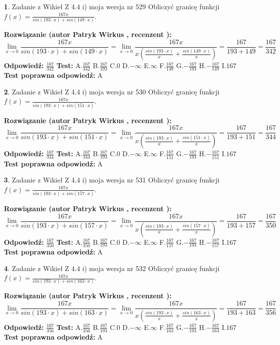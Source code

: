 \documentclass[12pt, a4paper]{article}
\theoremstyle{definition} %
\newtheorem{zad}{}
\newcommand{\zadStart}[1]{\begin{zad}#1\newline}
\newcommand{\zadStop}{\end{zad}}
\newcommand{\rozwStart}[2]{\noindent \textbf{Rozwiązanie (autor #1 , recenzent #2): }\newline}
\newcommand{\rozwStop}{\newline}
\newcommand{\odpStart}{\noindent \textbf{Odpowiedź:}\newline}
\newcommand{\odpStop}{\newline}
\newcommand{\testStart}{\noindent \textbf{Test:}\newline}
\newcommand{\testStop}{\newline}
\newcommand{\kluczStart}{\noindent \textbf{Test poprawna odpowiedź:}\newline}
\newcommand{\kluczStop}{\newline}
\begin{document}
\zadStart{Zadanie z Wikieł Z 4.4 i) moja wersja nr 529}
Obliczyć granicę funkcji $f(x)=\frac{167x}{sin(193\cdot x) +sin(149\cdot x)}$.
\zadStop
\rozwStart{Patryk Wirkus}{}
$$\lim\limits_{x\to 0}\frac{167x}{sin(193\cdot x) +sin(149\cdot x)}=\lim\limits_{x\to 0}\frac{167x}{x(\frac{sin(193\cdot x)}{x}+\frac{sin(149\cdot x)}{x})}=\frac{167}{193+149} = \frac{167}{342}$$
\rozwStop
\odpStart
$\frac{167}{342}$
\odpStop
\testStart
A.$\frac{167}{342}$
B.$\frac{167}{193}$
C.$0$
D.$-\infty$
E.$\infty$
F.$\frac{167}{149}$
G.$-\frac{167}{193}$
H.$-\frac{167}{149}$
I.$167$
\testStop
\kluczStart
A
\kluczStop



\zadStart{Zadanie z Wikieł Z 4.4 i) moja wersja nr 530}
Obliczyć granicę funkcji $f(x)=\frac{167x}{sin(193\cdot x) +sin(151\cdot x)}$.
\zadStop
\rozwStart{Patryk Wirkus}{}
$$\lim\limits_{x\to 0}\frac{167x}{sin(193\cdot x) +sin(151\cdot x)}=\lim\limits_{x\to 0}\frac{167x}{x(\frac{sin(193\cdot x)}{x}+\frac{sin(151\cdot x)}{x})}=\frac{167}{193+151} = \frac{167}{344}$$
\rozwStop
\odpStart
$\frac{167}{344}$
\odpStop
\testStart
A.$\frac{167}{344}$
B.$\frac{167}{193}$
C.$0$
D.$-\infty$
E.$\infty$
F.$\frac{167}{151}$
G.$-\frac{167}{193}$
H.$-\frac{167}{151}$
I.$167$
\testStop
\kluczStart
A
\kluczStop



\zadStart{Zadanie z Wikieł Z 4.4 i) moja wersja nr 531}
Obliczyć granicę funkcji $f(x)=\frac{167x}{sin(193\cdot x) +sin(157\cdot x)}$.
\zadStop
\rozwStart{Patryk Wirkus}{}
$$\lim\limits_{x\to 0}\frac{167x}{sin(193\cdot x) +sin(157\cdot x)}=\lim\limits_{x\to 0}\frac{167x}{x(\frac{sin(193\cdot x)}{x}+\frac{sin(157\cdot x)}{x})}=\frac{167}{193+157} = \frac{167}{350}$$
\rozwStop
\odpStart
$\frac{167}{350}$
\odpStop
\testStart
A.$\frac{167}{350}$
B.$\frac{167}{193}$
C.$0$
D.$-\infty$
E.$\infty$
F.$\frac{167}{157}$
G.$-\frac{167}{193}$
H.$-\frac{167}{157}$
I.$167$
\testStop
\kluczStart
A
\kluczStop



\zadStart{Zadanie z Wikieł Z 4.4 i) moja wersja nr 532}
Obliczyć granicę funkcji $f(x)=\frac{167x}{sin(193\cdot x) +sin(163\cdot x)}$.
\zadStop
\rozwStart{Patryk Wirkus}{}
$$\lim\limits_{x\to 0}\frac{167x}{sin(193\cdot x) +sin(163\cdot x)}=\lim\limits_{x\to 0}\frac{167x}{x(\frac{sin(193\cdot x)}{x}+\frac{sin(163\cdot x)}{x})}=\frac{167}{193+163} = \frac{167}{356}$$
\rozwStop
\odpStart
$\frac{167}{356}$
\odpStop
\testStart
A.$\frac{167}{356}$
B.$\frac{167}{193}$
C.$0$
D.$-\infty$
E.$\infty$
F.$\frac{167}{163}$
G.$-\frac{167}{193}$
H.$-\frac{167}{163}$
I.$167$
\testStop
\kluczStart
A
\kluczStop
\end{document}
